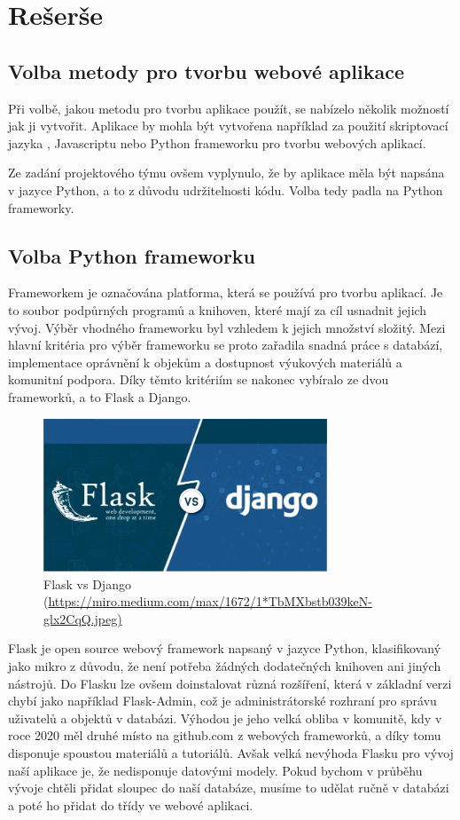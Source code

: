 \chapter{Rešerše}
\label{1-reserse}

\section{Volba metody pro tvorbu webové aplikace}

Při volbě, jakou metodu pro tvorbu aplikace použít, se nabízelo několik
možností jak ji vytvořit. Aplikace by mohla být vytvořena například za použití
skriptovací jazyka , Javascriptu nebo Python frameworku 
pro tvorbu webových aplikací. 

Ze zadání projektového týmu ovšem vyplynulo, že by aplikace měla být
napsána v jazyce Python, a to z důvodu udržitelnosti kódu. Volba tedy
padla na Python frameworky.

\section{Volba Python frameworku}
Frameworkem je označována platforma, která se používá pro tvorbu aplikací. 
Je to soubor podpůrných programů a knihoven, které mají za cíl usnadnit 
jejich vývoj. Výběr vhodného frameworku byl vzhledem k jejich množství 
složitý. Mezi hlavní kritéria pro výběr frameworku se proto zařadila snadná
práce s databází, implementace oprávnění k objekům a dostupnost 
výukových materiálů a komunitní podpora. Díky těmto kritériím se nakonec 
vybíralo ze dvou frameworků, a to Flask a Django.

\begin{figure}[H] \centering
    \includegraphics[width=240pt]{./pictures/1-django-vs-flask.jpeg}
    \caption[Flask vs Django]{Flask vs Django (\url{https://miro.medium.com/max/1672/1*TbMXbstb039keN-glx2CqQ.jpeg)}}
	\label{fig:Flask vs Django}                                
\end{figure}

Flask je open source webový framework napsaný v jazyce Python, klasifikovaný
jako mikro z důvodu, že není potřeba žádných dodatečných knihoven ani
jiných nástrojů. Do Flasku lze ovšem doinstalovat různá rozšíření,
která v základní verzi chybí jako například Flask-Admin, což je
administrátorské rozhraní pro správu uživatelů a objektů v
databázi. Výhodou je jeho velká obliba v komunitě, kdy v roce 2020 měl
druhé místo na github.com z webových frameworků, a díky tomu disponuje
spoustou materiálů a tutoriálů. Avšak velká nevýhoda Flasku pro vývoj
naší aplikace je, že nedisponuje datovými modely. Pokud bychom v průběhu
vývoje chtěli přidat sloupec do naší databáze, musíme to udělat ručně
v databázi a poté ho přidat do třídy ve webové aplikaci. \cite{flask}

